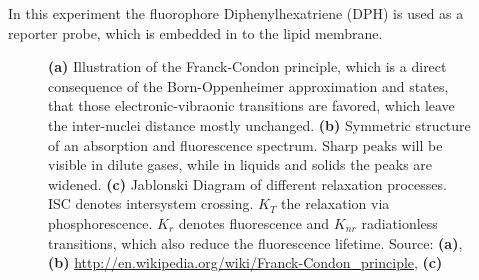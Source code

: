\documentclass[draft]{scrartcl}
\numberwithin{equation}{section}
\numberwithin{figure}{section}
\numberwithin{table}{section}
\begin{document}
In this experiment the fluorophore Diphenylhexatriene (DPH) is used as a reporter probe, which is embedded in to the lipid membrane.

\begin{figure}
\centering
{}
\hfill
{}

\caption{ \small \textbf{(a)} Illustration of the Franck-Condon principle, which is a direct consequence of the Born-Oppenheimer approximation and states, that those electronic-vibraonic transitions are favored, which leave the inter-nuclei distance mostly unchanged. 
\textbf{(b)} Symmetric structure of an absorption and fluorescence spectrum. Sharp peaks will be visible in dilute gases, while in liquids and solids the peaks are widened. 
\textbf{(c)} Jablonski Diagram of different relaxation processes. ISC denotes intersystem crossing. $K_T$ the relaxation via phosphorescence. $K_r$ denotes fluorescence and $K_{nr}$ radiationless transitions, which also reduce the fluorescence lifetime. \footnotesize Source: \textbf{(a)}, \textbf{(b)} \url{http://en.wikipedia.org/wiki/Franck-Condon_principle}, \textbf{(c)} \cite{omg}}
\label{condon}
\end{figure}








\clearpage
 

\end{document}
